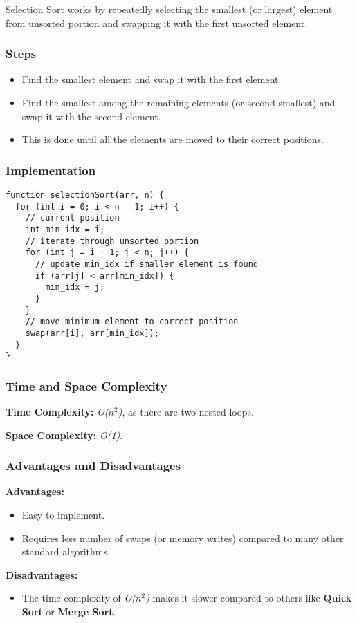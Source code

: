 Selection Sort works by repeatedly selecting the smallest (or largest) element from unsorted portion and swapping it with the first unsorted element.

\subsubsection*{Steps}

\begin{itemize}
  \item Find the smallest element and swap it with the first element.
  \item Find the smallest among the remaining elements (or second smallest) and swap it with the second element.
  \item This is done until all the elements are moved to their correct positions.
\end{itemize}

\subsubsection*{Implementation}

\begin{lstlisting}[style=general]
function selectionSort(arr, n) {
  for (int i = 0; i < n - 1; i++) {
    // current position
    int min_idx = i;
    // iterate through unsorted portion
    for (int j = i + 1; j < n; j++) {
      // update min_idx if smaller element is found
      if (arr[j] < arr[min_idx]) {
        min_idx = j;
      }
    }
    // move minimum element to correct position
    swap(arr[i], arr[min_idx]);
  }
}
\end{lstlisting}

\subsubsection*{Time and Space Complexity}

\textbf{Time Complexity:} \textit{O($n^2$)}, as there are two nested loops.

\textbf{Space Complexity:} \textit{O(1)}.

\subsubsection*{Advantages and Disadvantages}

\textbf{Advantages:}

\begin{itemize}
  \item Easy to implement.
  \item Requires less number of swaps (or memory writes) compared to many other standard algorithms.
\end{itemize}

\textbf{Disadvantages:}

\begin{itemize}
  \item The time complexity of \textit{O($n^2$)} makes it slower compared to others like \textbf{Quick Sort} or \textbf{Merge Sort}.
\end{itemize}
